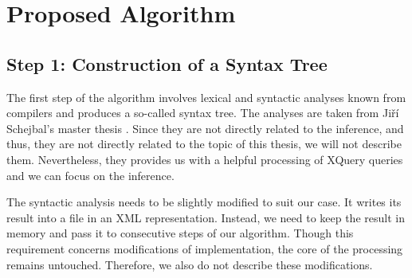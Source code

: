 \chapter{Proposed Algorithm}

\section{Step 1: Construction of a Syntax Tree}
The first step of the algorithm involves lexical and syntactic analyses known from compilers and produces a so-called syntax tree. The analyses are taken from Ji\v r\'{i} Schejbal's master thesis . Since they are not directly related to the inference, and thus, they are not directly related to the topic of this thesis, we will not describe them. Nevertheless, they provides us with a helpful processing of XQuery queries and we can focus on the inference.

The syntactic analysis needs to be slightly modified to suit our case. It writes its result into a file in an XML representation. Instead, we need to keep the result in memory and pass it to consecutive steps of our algorithm. Though this requirement concerns modifications of implementation, the core of the processing remains untouched. Therefore, we also do not describe these modifications.


